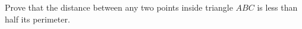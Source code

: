 Prove that the distance between any two points inside triangle $ABC$ is less than half its perimeter.
